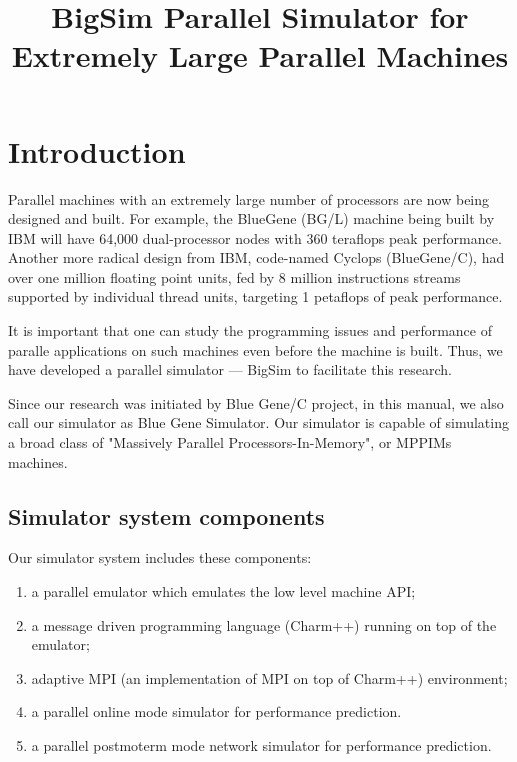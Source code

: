 \documentclass[10pt]{article}
\title{BigSim Parallel Simulator for Extremely Large Parallel Machines}
\begin{document}
\maketitle

\section{Introduction}


Parallel machines with an extremely large number of processors are now
being designed and built. For example, the BlueGene (BG/L) machine
being built by IBM will have 64,000 dual-processor nodes with 360 teraflops
peak performance. Another more radical design from IBM,
code-named Cyclops (BlueGene/C), had over one million floating point units,
fed by 8 million instructions streams supported by individual thread units,
targeting 1 petaflops of peak performance.


It is important that one can study the programming issues and performance
of paralle applications on such machines even before the machine is built.
Thus, we have developed a parallel simulator --- BigSim to facilitate this research.

Since our research was initiated by Blue Gene/C project, in this manual, 
we also call our simulator as Blue Gene Simulator.
Our simulator is capable of simulating a broad class of "Massively Parallel
Processors-In-Memory", or MPPIMs machines. 

\subsection{Simulator system components}

Our simulator system includes these components: 
\begin{enumerate}
\item a parallel emulator which emulates the low level machine API; 
\item a message driven programming language (Charm++) running on top of the emulator; 
\item adaptive MPI (an implementation of MPI on top of Charm++) environment; 
\item a parallel online mode simulator for performance prediction. 
\item a parallel postmoterm mode network simulator for performance prediction. 
\end{enumerate}
\end{document}

